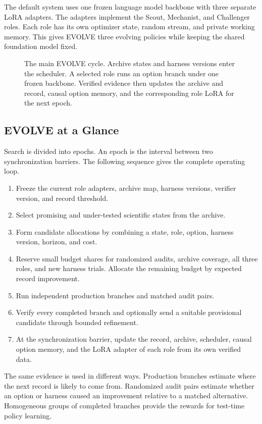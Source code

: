 The default system uses one frozen language model backbone with three separate LoRA adapters. The adapters implement the Scout, Mechanist, and Challenger roles. Each role has its own optimizer state, random stream, and private working memory. This gives EVOLVE three evolving policies while keeping the shared foundation model fixed.

\begin{figure}[t]
\centering
\resizebox{\linewidth}{!}{}
\caption{The main EVOLVE cycle. Archive states and harness versions enter the scheduler. A selected role runs an option branch under one frozen backbone. Verified evidence then updates the archive and record, causal option memory, and the corresponding role LoRA for the next epoch.}
\label{figframework}
\end{figure}

\subsection{EVOLVE at a Glance}
\label{secoverview}

Search is divided into epochs. An epoch is the interval between two synchronization barriers. The following sequence gives the complete operating loop.

\begin{enumerate}
\item Freeze the current role adapters, archive map, harness versions, verifier version, and record threshold.
\item Select promising and under-tested scientific states from the archive.
\item Form candidate allocations by combining a state, role, option, harness version, horizon, and cost.
\item Reserve small budget shares for randomized audits, archive coverage, all three roles, and new harness trials. Allocate the remaining budget by expected record improvement.
\item Run independent production branches and matched audit pairs.
\item Verify every completed branch and optionally send a suitable provisional candidate through bounded refinement.
\item At the synchronization barrier, update the record, archive, scheduler, causal option memory, and the LoRA adapter of each role from its own verified data.
\end{enumerate}

The same evidence is used in different ways. Production branches estimate where the next record is likely to come from. Randomized audit pairs estimate whether an option or harness caused an improvement relative to a matched alternative. Homogeneous groups of completed branches provide the rewards for test-time policy learning.


